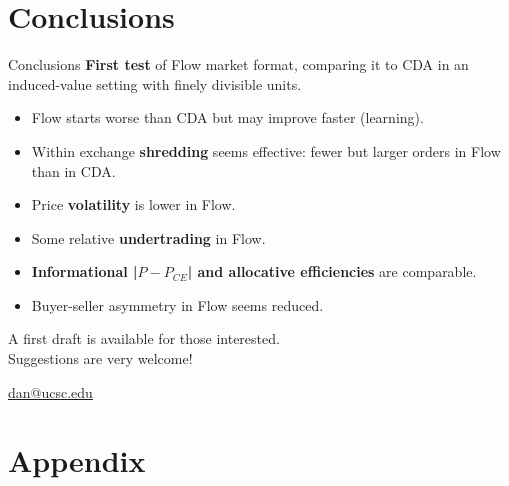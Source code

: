 \documentclass[10pt]{beamer}
\begin{document}


\section{Conclusions}

\begin{frame}{Conclusions}
\textbf{First test} of Flow market format, comparing it to CDA in an induced-value setting with finely divisible units. %
\begin{itemize}
\item Flow starts worse than CDA but may improve faster (learning).
\item Within exchange \textbf{shredding} seems effective: fewer but larger orders in Flow than in CDA.
\item Price \textbf{volatility} is lower in Flow.  %
\item Some relative \textbf{undertrading} in Flow.
\item \textbf{Informational  |$P-P_{CE}$| and allocative efficiencies} are comparable. %
\item Buyer-seller asymmetry in Flow seems reduced.%
\end{itemize} 
\vspace{0.4cm}

\begin{center}
{\large A first draft is available for those interested. \\ Suggestions are very welcome!}

\url{dan@ucsc.edu}
    
\end{center}


\end{frame}








\section{Appendix}
\end{document}
